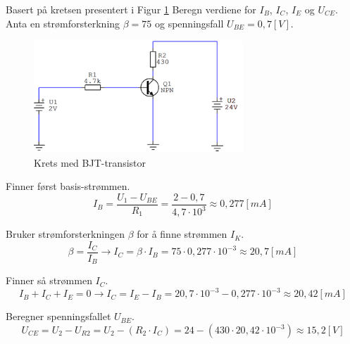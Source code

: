 \vspace{0.5cm} %


\begin{question}[name=Oppgave, topic=transBJT]
Basert på kretsen presentert i Figur \ref{fig:tranBJT1} Beregn verdiene for $I_B$, $I_C$, $I_E$ og $U_{CE}$. Anta en strømforsterkning $\beta =75$ og spenningsfall $U_{BE}=0,7[V]$.

	\begin{figure}[H]
		\centering
		\includegraphics[width=0.7\textwidth]{transistor-BJT/figurer/krets1.png}
		\caption{Krets med BJT-transistor}
		\label{fig:tranBJT1}
	\end{figure}

\end{question}

\vspace{0.5cm} %

\begin{solution}[name=Løsningsforslag oppgave]
Finner først basis-strømmen.
\[I_B=\frac{U_1-U_{BE}}{R_1}=\frac{2-0,7}{4,7\cdot 10^3}\approx 0,277 [mA]\]

Bruker strømforsterkningen $ \beta $ for å finne strømmen $I_K$.
\[\beta=\frac{I_C}{I_B} \rightarrow I_C= \beta \cdot I_B=75\cdot0,277 \cdot10^{-3} \approx 20,7[mA]\]


Finner så strømmen  $I_C$.
\[I_B+I_C+I_E=0 \rightarrow I_C=I_E-I_B=20,7\cdot 10^{-3} - 0,277 \cdot 10^{-3} \approx 20,42 [mA]\]

Beregner spenningsfallet $U_{BE}$.
\[U_{CE}=U_2-U_{R2}=U_2-(R_2 \cdot I_C) =24-(430 \cdot 20,42 \cdot 10^{-3}) \approx 15,2[V]\]
	
\end{solution}

\vspace{0.5cm} %

